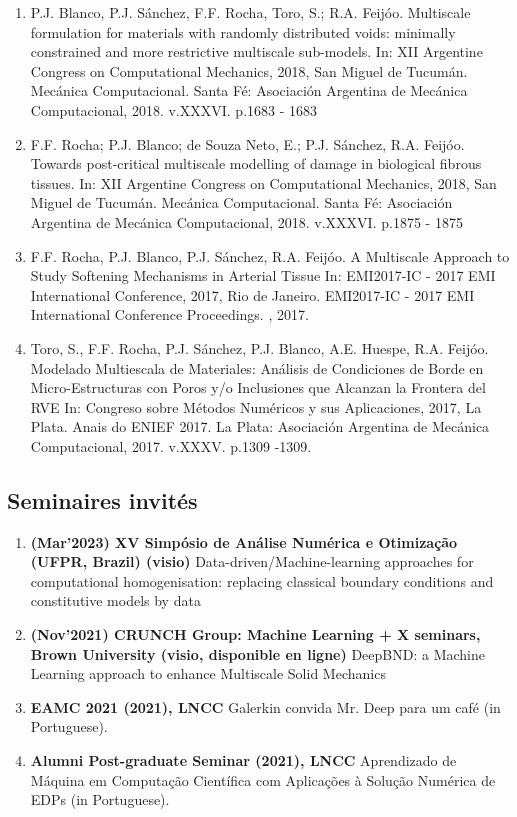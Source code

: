 \documentclass[french]{article}
\begin{document}
\begin{enumerate}
	\item P.J. Blanco, P.J. Sánchez, F.F. Rocha, Toro, S.; R.A. Feijóo.
	Multiscale formulation for materials with randomly distributed voids: minimally constrained and more restrictive multiscale sub-models. In: XII Argentine Congress on
	Computational Mechanics, 2018, San Miguel de Tucumán.
	Mecánica Computacional. Santa Fé: Asociación Argentina de Mecánica Computacional, 2018. v.XXXVI.
	p.1683 - 1683
	\item F.F. Rocha; P.J. Blanco; de Souza Neto, E.; P.J. Sánchez, R.A. Feijóo.
	Towards post-critical multiscale modelling of damage in biological fibrous tissues.
	In: XII Argentine Congress on Computational Mechanics, 2018, San Miguel de Tucumán.
	Mecánica Computacional. Santa Fé: Asociación Argentina de Mecánica Computacional, 2018. v.XXXVI.
	p.1875 - 1875
	\item F.F. Rocha, P.J. Blanco, P.J. Sánchez, R.A. Feijóo.
	A Multiscale Approach to Study Softening Mechanisms in Arterial Tissue In: EMI2017-IC - 2017 EMI
	International Conference, 2017, Rio de Janeiro. EMI2017-IC - 2017 EMI International Conference Proceedings. , 2017.
	\item Toro, S., F.F. Rocha, P.J. Sánchez, P.J. Blanco, A.E. Huespe, R.A. Feijóo.
	Modelado Multiescala de Materiales: Análisis de Condiciones de Borde en Micro-Estructuras con Poros y/o
	Inclusiones que Alcanzan la Frontera del RVE In: Congreso sobre Métodos Numéricos y sus Aplicaciones,
	2017, La Plata. Anais do ENIEF 2017. La Plata: Asociación Argentina de Mecánica Computacional, 2017. v.XXXV. p.1309 -1309.
\end{enumerate}


\subsection*{Seminaires invités}
\begin{enumerate}
	\item \textbf{(Mar'2023) XV Simpósio de Análise Numérica e Otimização (UFPR, Brazil) (visio)}  Data-driven/Machine-learning approaches for computational homogenisation: replacing classical boundary conditions and constitutive models by data
	\item \textbf{(Nov'2021) CRUNCH Group: Machine Learning + X seminars, Brown University (visio, disponible en ligne)}  DeepBND: a Machine Learning approach to enhance Multiscale Solid Mechanics
	\item \textbf{EAMC 2021 (2021), LNCC} Galerkin convida Mr. Deep para um café (in Portuguese).
	\item \textbf{Alumni Post-graduate Seminar (2021), LNCC} Aprendizado de Máquina em Computação Científica com Aplicações à Solução Numérica de EDPs (in Portuguese).
\end{enumerate}
\end{document}
